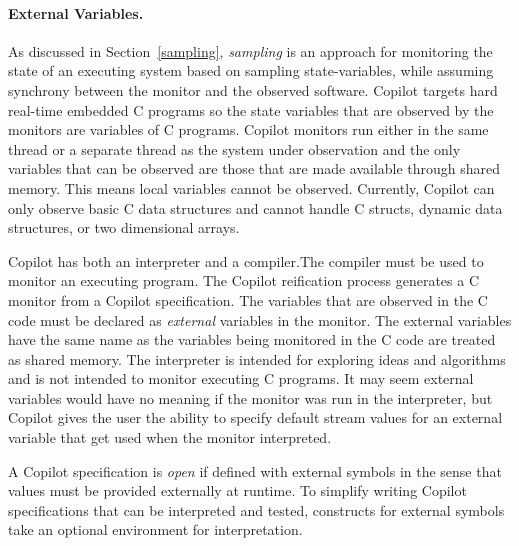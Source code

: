 \paragraph{External Variables.}


As discussed in Section~\ref{sampling}, \emph{sampling} is an approach
for monitoring the state of an executing system based on sampling
state-variables, while assuming synchrony between the monitor and the
observed software. Copilot targets hard real-time embedded C programs
so the state variables that are observed by the monitors are variables
of C programs. Copilot monitors run either in the same thread or a
separate thread as the system under observation and the only variables
that can be observed are those that are made available through shared
memory. This means local variables cannot be observed. Currently,
Copilot can only observe basic C data structures and cannot handle C
structs, dynamic data structures, or two dimensional arrays.


Copilot has both an interpreter and a compiler.The compiler must be
used to monitor an executing program. The Copilot reification process
generates a C monitor from a Copilot specification. The variables that
are observed in the C code must be declared as \emph{external}
variables in the monitor. The external variables have the same name as
the variables being monitored in the C code are treated as shared
memory. The interpreter is intended for exploring ideas and algorithms
and is not intended to monitor executing  C
programs. It may seem external variables would have no meaning if the
monitor was run in the interpreter, but Copilot gives the user the
ability to specify default stream values for an external variable that
get used when the monitor interpreted.

 A Copilot specification is \emph{open} if defined with external symbols in the
sense that values must be provided externally at runtime.  To simplify writing
Copilot specifications that can be interpreted and tested, constructs for
external symbols take an optional environment for interpretation.


